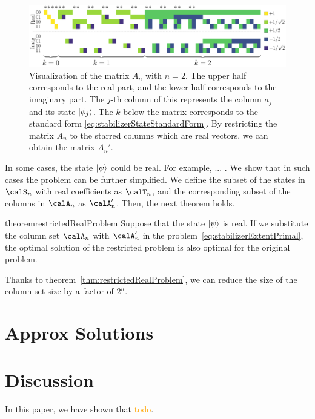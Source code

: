 \documentclass[a4paper, onecolumn, 11pt, longbibliography]{quantumarticle}
\newcommand{\orange}[1]{\textcolor{orange}{#1}}
\begin{document}
\begin{figure}[htbp]
    \centering
    \includegraphics[width=\columnwidth]{imgs/Amat.pdf}
    \caption{
        Visualization of the matrix $A_n$ with $n=2$.
        The upper half corresponds to the real part,
        and the lower half corresponds to the imaginary part.
        The $j$-th column of this represents
        the column $a_j$ and its state $\ket{\phi_j}$.
        The $k$ below the matrix
        corresponds to
        the standard form \eqref{eq:stabilizerStateStandardForm}.
        By restricting the matrix $A_n$
        to the starred columns
        which are real vectors,
        we can obtain the matrix $A_n'$.
    }
    \label{fig:Amat}
\end{figure}

In some cases, the state $\ket{\psi}$ could be real.
For example, ... .
We show that in such cases the problem can be further simplified.
We define the subset of the states in $\calS_n$ with real coefficients as $\calT_n$,
and the corresponding subset of the columns in $\calA_n$ as $\calA'_n$.
Then, the next theorem holds.
\begin{restatable}{theorem}{restrictedRealProblem}
    \label{thm:restrictedRealProblem}
    Suppose that the state $\ket{\psi}$ is real.
    If we substitute the column set $\calA_n$ with $\calA'_n$
    in the problem~\eqref{eq:stabilizerExtentPrimal},
    the optimal solution of the restricted problem
    is also optimal for the original problem.
\end{restatable}

Thanks to theorem~\ref{thm:restrictedRealProblem},
we can reduce the size of the column set size
by a factor of $2^n$.

\section{Approx Solutions}

\section{Discussion}

In this paper, we have shown that \orange{todo}.
\end{document}
